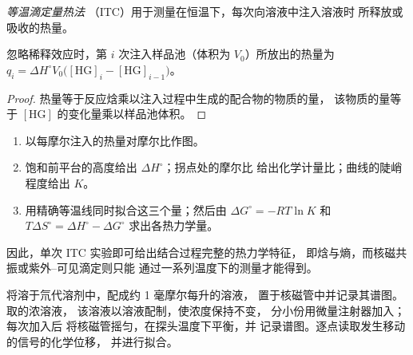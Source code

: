 \begin{definition}[等温滴定量热法]\label{def:b3:supramolecular:itc}
\emph{等温滴定量热法}
（ITC）用于测量在恒温下，每次向溶液中注入溶液时
所释放或吸收的热量。
\end{definition}

\begin{proposition}[每次注入的热量]\label{prop:b3:supramolecular:itc}
忽略稀释效应时，第 $i$ 次注入样品池（体积为 $V_0$）所放出的热量为
$q_i = \Delta H^\circ V_0\bigl([\mathrm{HG}]_i - [\mathrm{HG}]_{i-1}\bigr)$。
\end{proposition}

\begin{proof}
热量等于反应焓乘以注入过程中生成的配合物的物质的量，
该物质的量等于 $[\mathrm{HG}]$ 的变化量乘以样品池体积。
\end{proof}

\begin{method}\label{met:b3:supramolecular:itc}
\begin{enumerate}
  \item 以每摩尔注入的热量对摩尔比作图。
  \item 饱和前平台的高度给出 $\Delta H^\circ$；拐点处的摩尔比
        给出化学计量比；曲线的陡峭程度给出 $K$。
  \item 用精确等温线同时拟合这三个量；然后由 $\Delta G^\circ = -RT\ln K$ 和
        $T\Delta S^\circ = \Delta H^\circ - \Delta G^\circ$ 求出各热力学量。
\end{enumerate}
\end{method}

因此，单次 ITC 实验即可给出结合过程完整的热力学特征，
即焓与熵，而核磁共振或紫外–可见滴定则只能
通过一系列温度下的测量才能得到。

\begin{inthelab}[核磁共振滴定]
将溶于氘代溶剂中，配成约 1 毫摩尔每升的溶液，
置于核磁管中并记录其谱图。取的浓溶液，
该溶液以溶液配制，使浓度保持不变，
分小份用微量注射器加入；每次加入后
将核磁管摇匀，在探头温度下平衡，并
记录谱图。逐点读取发生移动的信号的化学位移，
并进行拟合。
\end{inthelab}


